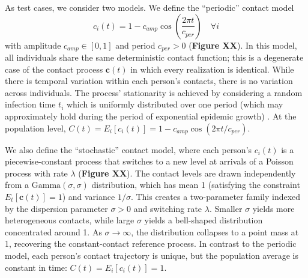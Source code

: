 As test cases, we consider two models. We define the ``periodic'' contact model
%
\begin{equation}
	c_i(t) = 1 - c_{amp} \cos\left(\frac{2 \pi t}{c_{per}}\right) \quad \forall i
	\label{eq:periodic_contacts}
\end{equation}
%
with amplitude $c_{amp} \in [0,1]$ and period $c_{per} > 0$ ({\bf Figure XX}). In this model, all individuals share the same deterministic contact function; this is a degenerate case of the contact process $\mathbf{c}(t)$ in which every realization is identical. While there is temporal variation within each person's contacts, there is no variation across individuals. The process' stationarity is achieved by considering a random infection time $t_i$ which is uniformly distributed over one period (which may approximately hold during the period of exponential epidemic growth) \citep{papoulis_probability_1965}. At the population level, $C(t) = E_i[c_i(t)] = 1 - c_{amp} \cos(2 \pi t / c_{per})$. 

We also define the ``stochastic'' contact model, where each person's $c_i(t)$ is a piecewise-constant process that switches to a new level at arrivals of a Poisson process with rate $\lambda$ ({\bf Figure XX}). The contact levels are drawn independently from a $\text{Gamma}(\sigma, \sigma)$ distribution, which has mean 1 (satisfying the constraint $E_t[\mathbf{c}(t)] = 1$) and variance $1/\sigma$. This creates a two-parameter family indexed by the dispersion parameter $\sigma > 0$ and switching rate $\lambda$. Smaller $\sigma$ yields more heterogeneous contacts, while large $\sigma$ yields a bell-shaped distribution concentrated around 1. As $\sigma \rightarrow \infty$, the distribution collapses to a point mass at 1, recovering the constant-contact reference process. In contrast to the periodic model, each person's contact trajectory is unique, but the population average is constant in time: $C(t) = E_i[c_i(t)] = 1$. 


